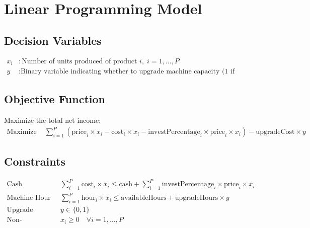 \documentclass{article}
\begin{document}
\section*{Linear Programming Model}

\subsection*{Decision Variables}
\begin{align*}
x_i & : \text{Number of units produced of product } i, \; i = 1, \ldots, P \\
y & : \text{Binary variable indicating whether to upgrade machine capacity (1 if upgrade, 0 otherwise)}
\end{align*}

\subsection*{Objective Function}
Maximize the total net income:
\begin{align*}
\text{Maximize } & \sum_{i=1}^{P} \left( \text{price}_i \times x_i - \text{cost}_i \times x_i - \text{investPercentage}_i \times \text{price}_i \times x_i \right) - \text{upgradeCost} \times y
\end{align*}

\subsection*{Constraints}
\begin{align*}
\text{Cash Constraint: } & \sum_{i=1}^{P} \text{cost}_i \times x_i \leq \text{cash} + \sum_{i=1}^{P} \text{investPercentage}_i \times \text{price}_i \times x_i \\
\text{Machine Hour Constraint: } & \sum_{i=1}^{P} \text{hour}_i \times x_i \leq \text{availableHours} + \text{upgradeHours} \times y \\
\text{Upgrade Binary Constraint: } & y \in \{0, 1\} \\
\text{Non-negativity: } & x_i \geq 0 \quad \forall i = 1, \ldots, P
\end{align*}
\end{document}
